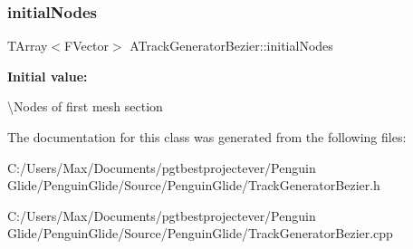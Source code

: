 \subsubsection{\texorpdfstring{initialNodes}{initialNodes}}
{\footnotesize\ttfamily T\+Array$<$F\+Vector$>$ A\+Track\+Generator\+Bezier\+::initial\+Nodes}

{\bfseries Initial value\+:}
\begin{DoxyCode}{0}
\DoxyCodeLine{= \{ }
\DoxyCodeLine{                                    \}}

\end{DoxyCode}


\textbackslash{}\+Nodes of first mesh section 



The documentation for this class was generated from the following files\+:\begin{DoxyCompactItemize}
\item 
C\+:/\+Users/\+Max/\+Documents/pgtbestprojectever/\+Penguin Glide/\+Penguin\+Glide/\+Source/\+Penguin\+Glide/Track\+Generator\+Bezier.\+h\item 
C\+:/\+Users/\+Max/\+Documents/pgtbestprojectever/\+Penguin Glide/\+Penguin\+Glide/\+Source/\+Penguin\+Glide/Track\+Generator\+Bezier.\+cpp\end{DoxyCompactItemize}
